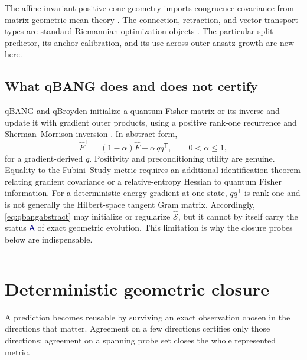 \documentclass[10pt,twocolumn]{article}
\theoremstyle{definition}
\theoremstyle{remark}
\newcommand{\conceptbreak}{\par\vspace{0.45em}\noindent\textcolor{navy!55}{\rule{\columnwidth}{0.35pt}}\vspace{0.35em}\par}
\newcommand{\status}[2]{\textcolor{#1}{\ensuremath{\boxed{\mathsf{#2}}}}}
\begin{document}
\begin{litbox}
The affine-invariant positive-cone geometry imports congruence covariance from matrix geometric-mean theory \cite{Moakher2005}.  The connection, retraction, and vector-transport types are standard Riemannian optimization objects \cite{Absil2008,Huang2015}.  The particular split predictor, its anchor calibration, and its use across outer ansatz growth are new here.
\end{litbox}

\subsection{What qBANG does and does not certify}

qBANG and qBroyden initialize a quantum Fisher matrix or its inverse and update it with gradient outer products, using a positive rank-one recurrence and Sherman--Morrison inversion \cite{Fitzek2024}.  In abstract form,
\begin{equation}
 \widehat F^{+}=(1-\alpha)\widehat F+\alpha\,q q^{\mathsf T},\qquad 0<\alpha\le1,
 \label{eq:qbangabstract}
\end{equation}
for a gradient-derived $q$.  Positivity and preconditioning utility are genuine.  Equality to the Fubini--Study metric requires an additional identification theorem relating gradient covariance or a relative-entropy Hessian to quantum Fisher information.  For a deterministic energy gradient at one state, $q q^{\mathsf T}$ is rank one and is not generally the Hilbert-space tangent Gram matrix.  Accordingly, \eqref{eq:qbangabstract} may initialize or regularize $\widehat{\mathcal S}$, but it cannot by itself carry the status \status{navy}{A} of exact geometric evolution.  This limitation is why the closure probes below are indispensable.

\conceptbreak

\section{Deterministic geometric closure}
\label{sec:closure}

\begin{microbox}
A prediction becomes reusable by surviving an exact observation chosen in the directions that matter.  Agreement on a few directions certifies only those directions; agreement on a spanning probe set closes the whole represented metric.
\end{microbox}
\end{document}
